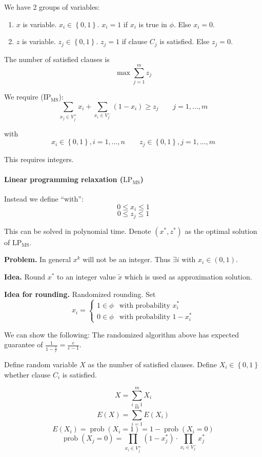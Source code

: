 \documentclass[a4paper]{article}
\newcommand{\set}[1]{\left\{#1\right\}}
\begin{document}
We have 2 groups of variables:
\begin{enumerate}
  \item $x$ is variable. $x_i \in \set{0,1}$. $x_i = 1$ if $x_i$ is true in $\phi$. Else $x_i = 0$.
  \item $z$ is variable. $z_j \in \set{0,1}$. $z_j = 1$ if clause $C_j$ is satisfied. Else $z_j = 0$.
\end{enumerate}

The number of satisfied clauses is
\[
  \max \sum_{j=1}^m z_j
\]

We require ($\text{IP}_{\text{MS}}$):
\[
  \sum_{x_j \in V_j^+} x_i + \sum_{x_i \in V_j^-} (1 - x_i) \geq z_j
      \qquad j = 1,\ldots,m
\]

with
\[
      x_i \in \set{0,1}, i = 1, \ldots, n \qquad
      z_j \in \set{0,1}, j = 1, \ldots, m
\]

This requires integers.

\paragraph{Linear programming relaxation ($\text{LP}_{\text{MS}}$)}
Instead we define ``with'':
\[
  0 \leq x_i \leq 1
\] \[
  0 \leq z_j \leq 1
\]

This can be solved in polynomial time.
Denote $(x^*, z^*)$ as the optimal solution of $\text{LP}_{\text{MS}}$.

\textbf{Problem.}
  In general $x^k$ will not be an integer. Thus $\exists i$ with $x_i \in (0,1)$.

\textbf{Idea.}
  Round $x^*$ to an integer value $\tilde{x}$ which is used as approximation solution.

\textbf{Idea for rounding.}
  Randomized rounding. Set
\[
  x_i = \begin{cases}
    1 \in \phi & \text{with probability } x_i^* \\
    0 \in \phi & \text{with probability } 1 - x_i^*
  \end{cases}
\]

We can show the following:
The randomized algorithm above has expected guarantee of
$\frac{1}{1 - \frac{1}{e}} = \frac{e}{e-1}$.

Define random variable $X$ as the number of satisfied clauses.
Define $X_i \in \set{0,1}$ whether clause $C_i$ is satisfied.

\[
  X = \sum_{i=1}^m X_i
\] \[
  E(X) = \sum_{i=1}^m E(X_i)
\] \[
  E(X_i) = \operatorname{prob}(X_i = 1) = 1 - \operatorname{prob}(X_i = 0)
\] \[
  \operatorname{prob}(X_j = 0) =
    \prod_{x_i \in V_j^+} (1 - x_j^*) \cdot \prod_{x_i \in V_j^-} x_j^*
\]
\end{document}
